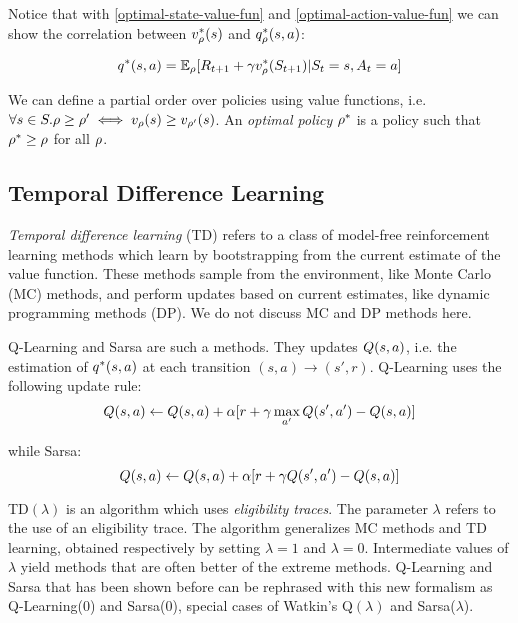 	Notice that with \ref{optimal-state-value-fun} and \ref{optimal-action-value-fun} we can show the correlation between $v^*_\rho(s)$ and $q^*_\rho(s, a)$:
	
	\begin{equation}
		q^*(s, a) = \mathbb{E}_\rho[R_{t+1} + \gamma v^*_\rho(S_{t+1})| S_t = s, A_t = a]
	\end{equation}
	
	
	We can define a partial order over policies using value functions, i.e. $\forall s\in S. \rho \ge \rho' \iff v_\rho(s) \ge v_{\rho'}(s)$. An \emph{optimal policy} $\rho^*$ is a policy such that $\rho^* \ge \rho$ for all $\rho$. 
	
	
\subsection{Temporal Difference Learning}

\emph{Temporal difference learning} (TD) refers to a class of model-free reinforcement learning methods which learn by bootstrapping from the current estimate of the value function. These methods sample from the environment, like Monte Carlo (MC) methods, and perform updates based on current estimates, like dynamic programming methods (DP). We do not discuss MC and DP methods here.

Q-Learning and Sarsa are such a methods. They updates $Q(s, a)$, i.e. the estimation of $q^*(s, a)$ at each transition $(s, a) \to (s', r)$. Q-Learning uses the following update rule:
\begin{equation}
Q(s, a) \leftarrow Q(s, a) + \alpha [r + \gamma \max_{a'} Q(s', a') - Q(s, a)]
\end{equation}

while Sarsa:
\begin{equation}
Q(s, a) \leftarrow Q(s, a) + \alpha [r + \gamma Q(s', a') - Q(s, a)]
\end{equation}

TD$(\lambda)$ is an algorithm which uses \emph{eligibility traces}. The parameter $\lambda$ refers to the use of an eligibility trace. The algorithm generalizes MC methods and TD learning, obtained respectively by setting $\lambda = 1$ and $\lambda = 0$. Intermediate values of $\lambda$ yield methods that are often better of the extreme methods. Q-Learning and Sarsa that has been shown before can be rephrased with this new formalism as Q-Learning(0) and Sarsa(0), special cases of Watkin's Q$(\lambda)$ and Sarsa($\lambda$).

